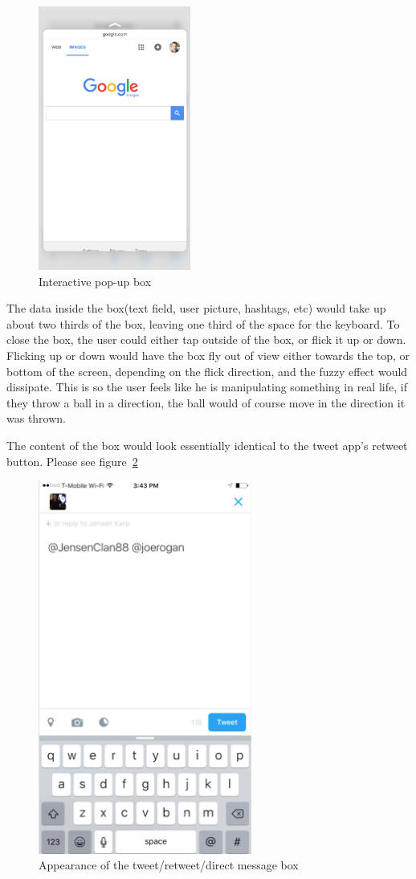 \documentclass[11pt]{article}
\begin{document}
\begin{figure}[H]
    \centering
    \includegraphics[width=5cm]{tweetInteractionImage}
    \caption{Interactive pop-up box}
    \label{fig:tweetInteraction}
\end{figure}

The data inside the box(text field, user picture, hashtags, etc) would take up about two thirds of the box, leaving one third of the space for the keyboard. To close the box, the user could either tap outside of the box, or flick it up or down. Flicking up or down would have the box fly out of view either towards the top, or bottom of the screen, depending on the flick direction, and the fuzzy effect would dissipate. This is so the user feels like he is manipulating something in real life, if they throw a ball in a direction, the ball would of course move in the direction it was thrown.

The content of the box would look essentially identical to the tweet app's retweet button. Please see figure~\ref{fig:TweetInteractionBoxAppearance}


\begin{figure}[H]
    \centering
    \includegraphics[width=7cm]{retweetBox}
    \caption{Appearance of the tweet/retweet/direct message box}
    \label{fig:TweetInteractionBoxAppearance}
\end{figure}
\end{document}
